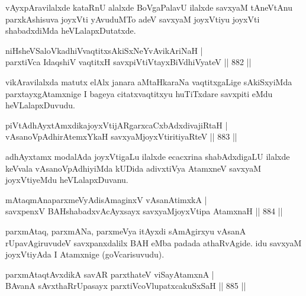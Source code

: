 \begin{artha}
vAyxpAravilalxde kataRnU alalxde BoVgaPalavU ilalxde savxyaM tAneVtAnu parxkAshisuva joyxVti yAvuduMTo adeV savxyaM joyxVtiyu joyxVti shabadxdiMda heVLalapxDutatxde.
\end{artha}


\begin{shl}
niHsheVSaloVkadhiVvaqtitxsAkiSxNeYvAvikAriNaH | \\
parxtiVca IdaqshiV vaqtitxH savxpiVtiVtayxBiVdhiVyateV \hfill||  882 ||  
\end{shl}

\begin{artha}
vikAravilalxda matutx elAlx janara aMtaHkaraNa vaqtitxgaLige sAkiSxyiMda parxtayxgAtamxnige I bageya citatxvaqtitxyu huTiTxdare savxpiti eMdu heVLalapxDuvudu.
\end{artha}

\begin{shl}
piVtAdhAyxtAmxdikajoyxVtijARgarxcaCxbAdxdivajiRtaH | \\
vAsanoVpAdhirAtemxYkaH savxyaMjoyxVtiritiyaRteV \hfill||  883 ||  
\end{shl}

\begin{artha}
adhAyxtamx modalAda joyxVtigaLu ilalxde ecacxrina shabAdxdigaLU ilalxde keVvala vAsanoVpAdhiyiMda kUDida adivxtiVya AtamxneV savxyaM joyxVtiyeMdu heVLalapxDuvanu.
\end{artha}


\begin{shl}
mAtaqmAnaparxmeVyAdisAmaginxV vAsanAtimxkA | \\
savxpenxV BAHshabadxvAcAyx\s sayx savxyaMjoyxVtipa AtamxnaH \hfill||  884 ||  
\end{shl}

\begin{artha}
parxmAtaq, parxmANa, parxmeVya itAyxdi sAmAgirxyu vAsanA rUpavAgiruvudeV savxpanxdalilx BAH eMba padada athaRvAgide. idu savxyaM joyxVtiyAda I Atamxnige (goVcarisuvudu).
\end{artha}


\begin{shl}
parxmAtaqtAvxdikA savAR parxthateV viSayAtamxnA | \\
BAvanA sAvxthaRrUpasayx parxtiVcoV\s lupatxcakuSxSaH \hfill||  885 ||  
\end{shl}

